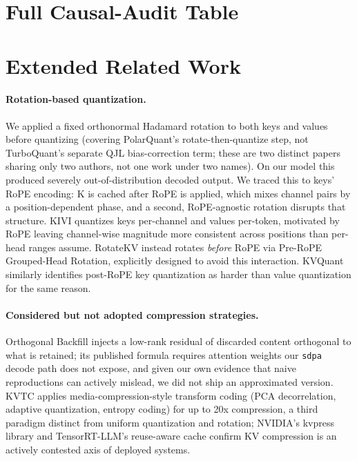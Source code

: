 \documentclass[11pt]{article}
\begin{document}
\section{Full Causal-Audit Table}
\label{app:tables}



\section{Extended Related Work}
\label{app:relwork}

\paragraph{Rotation-based quantization.}
\label{app:rotation}
We applied a fixed orthonormal
Hadamard rotation to both keys and values before quantizing
(covering PolarQuant's \citep{polarquant2026} rotate-then-quantize
step, not TurboQuant's \citep{turboquant2026} separate QJL
bias-correction term; these are two distinct papers sharing only two
authors, not one work under two names). On our model this produced
severely out-of-distribution decoded output. We traced this to keys'
RoPE encoding: K is cached after RoPE is applied, which mixes channel
pairs by a position-dependent phase, and a second, RoPE-agnostic
rotation disrupts that structure. KIVI \citep{kivi2024} quantizes keys
per-channel and values per-token, motivated by RoPE leaving channel-wise
magnitude more consistent across positions than per-head ranges assume.
RotateKV \citep{rotatekv2025} instead rotates \emph{before} RoPE via
Pre-RoPE Grouped-Head Rotation, explicitly designed to avoid this
interaction. KVQuant \citep{kvquant2024} similarly identifies post-RoPE
key quantization as harder than value quantization for the same reason.

\paragraph{Considered but not adopted compression strategies.}
Orthogonal Backfill \citep{orthobackfill2026} injects a low-rank
residual of discarded content orthogonal to what is retained; its
published formula requires attention weights our \texttt{sdpa} decode
path does not expose, and given our own evidence that naive
reproductions can actively mislead, we did not ship an approximated
version. KVTC \citep{kvtc2026} applies media-compression-style
transform coding (PCA decorrelation, adaptive quantization, entropy
coding) for up to 20x compression, a third paradigm distinct from
uniform quantization and rotation; NVIDIA's kvpress library and
TensorRT-LLM's reuse-aware cache confirm KV compression is an actively
contested axis of deployed systems.
\end{document}
